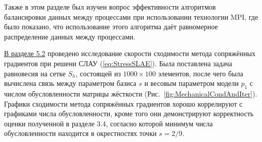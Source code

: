 Также в этом разделе был изучен вопрос эффективности алгоритмов балансировки данных между процессами при использовании технологии MPI, где было показано, что использование этого алгоритма даёт равномерное распределение данных между процессами.

\underline{В разделе 5.2} проведено исследование скорости сходимости метода сопряжённых градиентов при решени СЛАУ (\ref{eq:StressSLAE}). Была поставлена задача равновесия на сетке $S_h$, состоящей из $1000 \times 100$ элементов, после чего была вычислена связь между параметром базиса $s$ и весовым параметром модели $p_1$ с числом обусловленности матрицы жёсткости (Рис.~\ref{fig:MechanicalCondAndIter}). Графики сходимости метода сопряжённых градиентов хорошо коррелируют с графиками числа обусловленности, кроме того они демонстрируют корректность оценки полученной в разделе 3.4, согласно которой минимум числа обусловленности находится в окрестностях точки $s = 2/9$.

